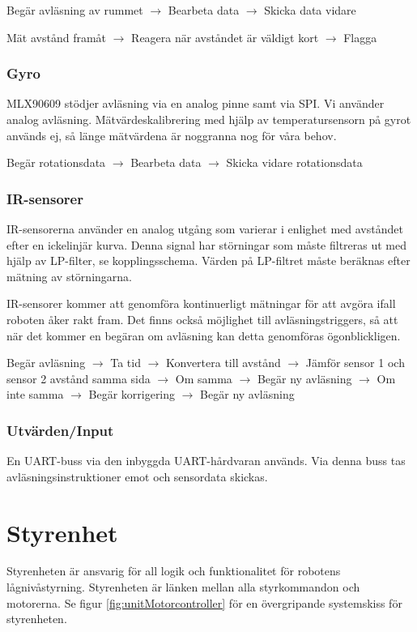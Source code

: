 \documentclass[a4paper,11pt]{article}
\begin{document}
Begär avläsning av rummet $\rightarrow$ Bearbeta data $\rightarrow$ Skicka data vidare

Mät avstånd framåt $\rightarrow$ Reagera när avståndet är väldigt kort $\rightarrow$ Flagga

\subsubsection{Gyro}
MLX90609 stödjer avläsning via en analog pinne samt via SPI. Vi använder analog avläsning. Mätvärdeskalibrering med hjälp av temperatursensorn på gyrot används ej, så länge mätvärdena är noggranna nog för våra behov.

Begär rotationsdata $\rightarrow$ Bearbeta data $\rightarrow$ Skicka vidare rotationsdata

\subsubsection{IR-sensorer}
IR-sensorerna använder en analog utgång som varierar i enlighet med avståndet efter en ickelinjär kurva. Denna signal har störningar som måste filtreras ut med hjälp av LP-filter, se kopplingsschema. Värden på LP-filtret måste beräknas efter mätning av störningarna.

IR-sensorer kommer att genomföra kontinuerligt mätningar för att avgöra ifall roboten åker rakt fram. Det finns också möjlighet till avläsningstriggers, så att när det kommer en begäran om avläsning kan detta genomföras ögonblickligen.

Begär avläsning $\rightarrow$ Ta tid $\rightarrow$ Konvertera till avstånd $\rightarrow$ Jämför sensor 1 och sensor 2 avstånd samma sida $\rightarrow$ Om samma $\rightarrow$ Begär ny avläsning $\rightarrow$ Om inte samma $\rightarrow$ Begär korrigering $\rightarrow$ Begär ny avläsning

\subsubsection{Utvärden/Input}
En UART-buss via den inbyggda UART-hårdvaran används. Via denna buss tas avläsningsinstruktioner emot och sensordata skickas.

\newpage
\section{Styrenhet} \label{sec:system2}
Styrenheten är ansvarig för all logik och funktionalitet för robotens lågnivåstyrning. Styrenheten är länken mellan alla styrkommandon och motorerna. Se figur \ref{fig:unitMotorcontroller} för en övergripande systemskiss för styrenheten.
\end{document}
